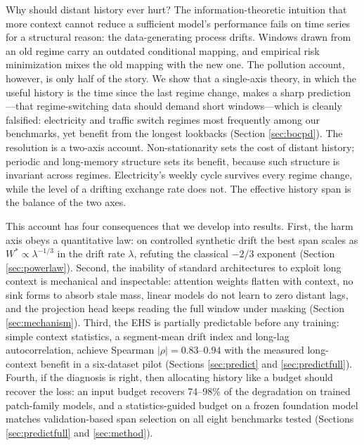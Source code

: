 Why should distant history ever hurt? The information-theoretic intuition that more context cannot reduce a sufficient model's performance fails on time series for a structural reason: the data-generating process drifts. Windows drawn from an old regime carry an outdated conditional mapping, and empirical risk minimization mixes the old mapping with the new one. The pollution account, however, is only half of the story. We show that a single-axis theory, in which the useful history is the time since the last regime change, makes a sharp prediction---that regime-switching data should demand short windows---which is cleanly falsified: electricity and traffic switch regimes most frequently among our benchmarks, yet benefit from the longest lookbacks (Section \ref{sec:bocpd}). The resolution is a two-axis account. Non-stationarity sets the cost of distant history; periodic and long-memory structure sets its benefit, because such structure is invariant across regimes. Electricity's weekly cycle survives every regime change, while the level of a drifting exchange rate does not. The effective history span is the balance of the two axes.

This account has four consequences that we develop into results. First, the harm axis obeys a quantitative law: on controlled synthetic drift the best span scales as $W^* \propto \lambda^{-1/3}$ in the drift rate $\lambda$, refuting the classical $-2/3$ exponent (Section \ref{sec:powerlaw}). Second, the inability of standard architectures to exploit long context is mechanical and inspectable: attention weights flatten with context, no sink forms to absorb stale mass, linear models do not learn to zero distant lags, and the projection head keeps reading the full window under masking (Section \ref{sec:mechanism}). Third, the EHS is partially predictable before any training: simple context statistics, a segment-mean drift index and long-lag autocorrelation, achieve Spearman $|\rho| = 0.83$--$0.94$ with the measured long-context benefit in a six-dataset pilot (Sections \ref{sec:predict} and \ref{sec:predictfull}). Fourth, if the diagnosis is right, then allocating history like a budget should recover the loss: an input budget recovers 74--98\% of the degradation on trained patch-family models, and a statistics-guided budget on a frozen foundation model matches validation-based span selection on all eight benchmarks tested (Sections \ref{sec:predictfull} and \ref{sec:method}).

